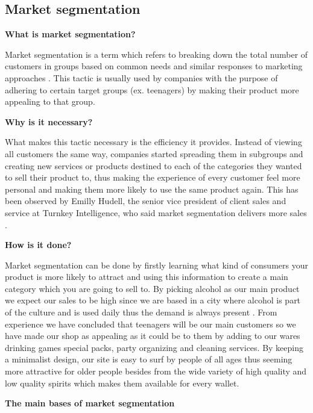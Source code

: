 \documentclass[12p]{article}
\begin{document}
\newpage


\subsection{Market segmentation} \label{MarketSegmentation}

\textbf{What is market segmentation?}

Market segmentation is a term which refers to breaking down the total number of customers in groups based on common needs and similar responses to marketing approaches \cite{MarketSegmentation}. This tactic is usually used by companies with the purpose of adhering to certain target groups (ex. teenagers) by making their product more appealing to that group.

\textbf{Why is it necessary?}

What makes this tactic necessary is the efficiency it provides. Instead of viewing all customers the same way, companies started spreading them in subgroups and creating new services or products destined to each of the categories they wanted to sell their product to, thus making the experience of every customer feel more personal and making them more likely to use the same product again. This has been observed by Emilly Hudell, the senior vice president of client sales and service at Turnkey Intelligence, who said market segmentation delivers more sales \cite{MarketSegmentationEfficieny}.

\textbf{How is it done?}

Market segmentation can be done by firstly learning what kind of consumers your product is more likely to attract and using this information to create a main category which you are going to sell to. By picking alcohol as our main product we expect our sales to be high since we are based in a city where alcohol is part of the culture and is used daily thus the demand is always present \cite{DanesBinge}. From experience we have concluded that teenagers will be our main customers so we have made our shop as appealing as it could be to them by adding to our wares drinking games special packs, party organizing and cleaning services. By keeping a minimalist design, our site is easy to surf by people of all ages thus seeming more attractive for older people besides from the wide variety of high quality and low quality spirits which makes them available for every wallet.

\textbf{The main bases of market segmentation}
\end{document}
